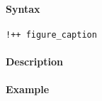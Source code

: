 


	\paragraph{Syntax}

\begin{verbatim}
!++ figure_caption
\end{verbatim}

\paragraph{Description}

\paragraph{Example}


